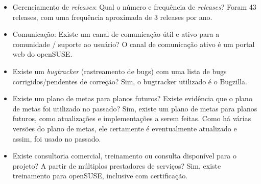 \documentclass[12pt,a4paper]{article} %
\begin{document}
\begin{itemize}
\item Gerenciamento de \textit{releases}: Qual o número e frequência de \textit{releases}?
Foram 43 releases, com uma frequência aproximada de 3 releases por ano.
\item Comunicação: Existe um canal de comunicação útil e ativo para a comunidade / suporte ao usuário?
O canal de comunicação ativo é um portal web do openSUSE.
\item Existe um \textit{bugtracker} (rastreamento de bugs) com uma lista de bugs corrigidos/pendentes de correção?
Sim, o bugtracker utilizado é o Bugzilla.
\item Existe um plano de metas para planos futuros? Existe evidência que o plano de metas foi utilizado no passado?
Sim, existe um plano de metas para planos futuros, como atualizações e implementações a serem feitas. Como há várias versões do plano de metas, ele certamente é eventualmente atualizado e assim, foi usado no passado.
\item Existe consultoria comercial, treinamento ou consulta disponível para o projeto? A partir de múltiplos prestadores de serviços?
Sim, existe treinamento para openSUSE, inclusive com certificação.
\end{itemize}
        

\par\vspace{\baselineskip}

\end{document}
